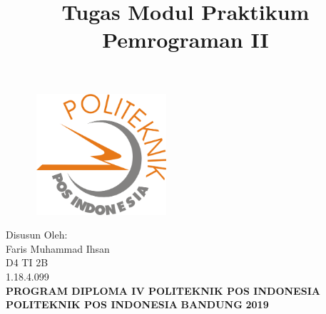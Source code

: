 \documentclass[a4paper, 12pt]{article}
\begin{document}
\title{\huge\textbf{Tugas Modul Praktikum Pemrograman II}}
\date{}

\maketitle


\begin{figure}[!ht]
\begin{center}
\includegraphics[width = 5cm, height = 4.5cm]{gambar/logo.png}
\end{center}
\end{figure}

\begin{center}
\vspace{1cm}
Disusun Oleh:\\
Faris Muhammad Ihsan\\
D4 TI 2B\\
1.18.4.099\\
\vspace{1cm}
\textbf{PROGRAM DIPLOMA IV POLITEKNIK POS INDONESIA} \linebreak
\textbf{POLITEKNIK POS INDONESIA} \linebreak
\textbf{BANDUNG}\linebreak
\textbf{2019}

\end{center}

\thispagestyle{empty}


\end{document}
